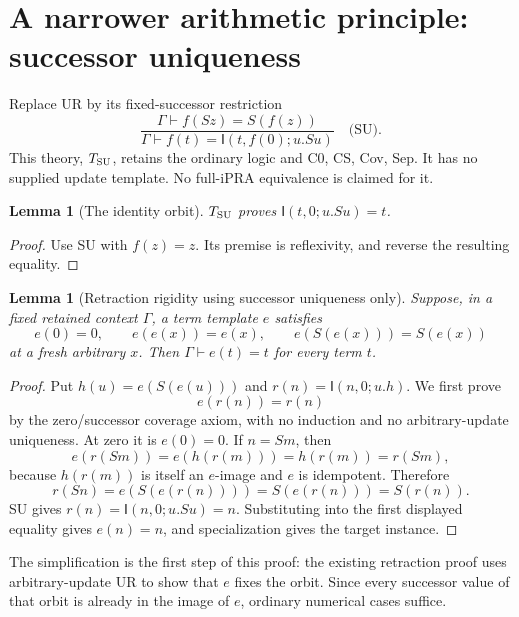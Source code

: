 \documentclass[11pt]{article}
\newtheorem{lemma}[theorem]{Lemma}
\theoremstyle{definition}
\newcommand{\Tsu}{T_{\rm SU}}
\newcommand{\I}{\mathsf I}
\newcommand{\G}{\Gamma}
\begin{document}
\section{A narrower arithmetic principle: successor uniqueness}
\label{sec:su}

Replace UR by its fixed-successor restriction
\[
 \frac{\G\vdash f(Sz)=S(f(z))}
      {\G\vdash f(t)=\I(t,f(0);u.Su)}\quad\text{(SU)}.
\]
This theory, $\Tsu$, retains the ordinary logic and C0, CS, Cov, Sep. It has no supplied update template. No full-iPRA equivalence is claimed for it.

\begin{lemma}[The identity orbit]
$\Tsu$ proves $\I(t,0;u.Su)=t$.
\end{lemma}
\begin{proof}
Use SU with $f(z)=z$. Its premise is reflexivity, and reverse the resulting equality.
\end{proof}

\begin{lemma}[Retraction rigidity using successor uniqueness only]
Suppose, in a fixed retained context $\G$, a term template $e$ satisfies
\[
 e(0)=0,\qquad e(e(x))=e(x),\qquad e(S(e(x)))=S(e(x))
\]
at a fresh arbitrary $x$. Then $\G\vdash e(t)=t$ for every term $t$.
\end{lemma}
\begin{proof}
Put $h(u)=e(S(e(u)))$ and $r(n)=\I(n,0;u.h)$. We first prove
\[
 e(r(n))=r(n)
\]
by the zero/successor coverage axiom, with no induction and no arbitrary-update uniqueness. At zero it is $e(0)=0$. If $n=Sm$, then
\[
 e(r(Sm))=e(h(r(m)))=h(r(m))=r(Sm),
\]
because $h(r(m))$ is itself an $e$-image and $e$ is idempotent. Therefore
\[
 r(Sn)=e(S(e(r(n))))=S(e(r(n)))=S(r(n)).
\]
SU gives $r(n)=\I(n,0;u.Su)=n$. Substituting into the first displayed equality gives $e(n)=n$, and specialization gives the target instance.
\end{proof}

The simplification is the first step of this proof: the existing retraction proof uses arbitrary-update UR to show that $e$ fixes the orbit. Since every successor value of that orbit is already in the image of $e$, ordinary numerical cases suffice.
\end{document}
